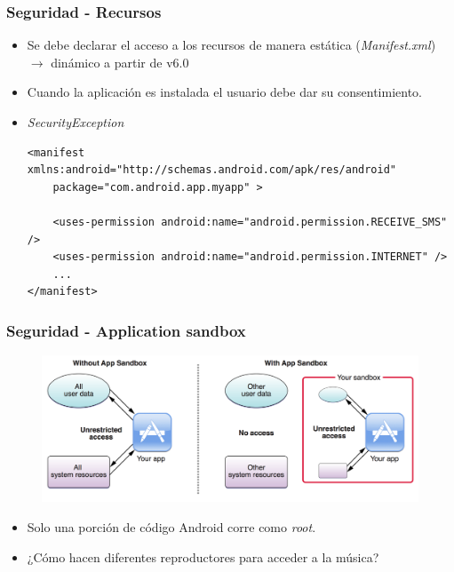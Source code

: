 \begin{frame}[fragile]
  \frametitle{Seguridad - Recursos}
  \begin{itemize}
    \item Se debe declarar el acceso a los recursos de manera estática (\textit{Manifest.xml}) $\rightarrow$ dinámico a partir de v6.0
    
    \item Cuando la aplicación es instalada el usuario debe dar su consentimiento.
    
    \item \textit{SecurityException}
    \begin{lstlisting}
<manifest xmlns:android="http://schemas.android.com/apk/res/android"
    package="com.android.app.myapp" >

    <uses-permission android:name="android.permission.RECEIVE_SMS" />
    <uses-permission android:name="android.permission.INTERNET" />
    ...
</manifest>
    \end{lstlisting}    
  \end{itemize}
\end{frame}

\begin{frame}
  \frametitle{Seguridad - Application sandbox}
  \begin{figure}
    \centering
    \includegraphics[scale=0.2]{images/sandbox.png}
  \end{figure}
  
  \begin{itemize}
      \item Solo una porción de código Android corre como \textit{root}.
      
      \item ¿Cómo hacen diferentes reproductores para acceder a la música?
  \end{itemize}
\end{frame}

